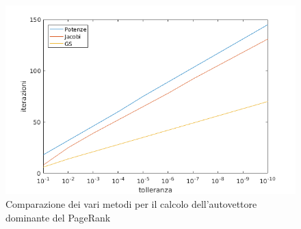 \begin{figure}
\includegraphics[width=\textwidth]{cap_5_6/es6/comparison}
\caption{Comparazione dei vari metodi per il calcolo dell'autovettore dominante del PageRank}
\label{PR_comparison}
\end{figure}
